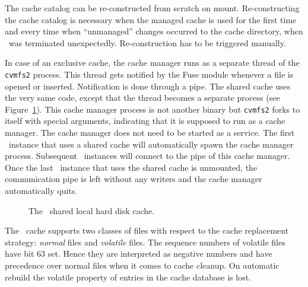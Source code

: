 The cache catalog can be re-constructed from scratch on mount.
Re-constructing the cache catalog is necessary when the managed cache is used for the first time and every time when ``unmanaged'' changes occurred to the cache directory, \eg when \cvmfs\ was terminated unexpectedly.
Re-construction has to be triggered manually.

In case of an exclusive cache, the cache manager runs as a separate thread of the \texttt{cvmfs2} process.
This thread gets notified by the Fuse module whenever a file is opened or inserted.  
Notification is done through a pipe.  
The shared cache uses the very same code, except that the thread becomes a separate process (see Figure~\ref{fig:sharedcache}).  
This cache manager process is not another binary but \texttt{cvmfs2} forks to itself with special arguments, indicating that it is supposed to run as a cache manager.  
The cache manager does not need to be started as a service.  
The first \cvmfs\ instance that uses a shared cache will automatically spawn the cache manager process.  
Subsequent \cvmfs\ instances will connect to the pipe of this cache manager.
Once the last \cvmfs\ instance that uses the shared cache is unmounted, the communication pipe is left without any writers and the cache manager automatically quits.

\begin{figure}
	\centering
	
	\caption{The \cvmfs\ shared local hard disk cache.}
	\label{fig:sharedcache}
\end{figure}

The \cvmfs\ cache supports two classes of files with respect to the cache replacement strategy: \emph{normal} files and \emph{volatile} files.
The sequence numbers of volatile files have bit 63 set.
Hence they are interpreted as negative numbers and have precedence over normal files when it comes to cache cleanup.
On automatic rebuild the volatile property of entries in the cache database is lost.

